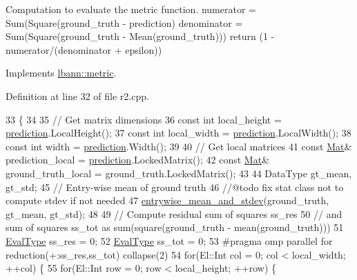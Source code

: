 Computation to evaluate the metric function. numerator = Sum(Square(ground\+\_\+truth -\/ prediction) denominator = Sum(Square(ground\+\_\+truth -\/ Mean(ground\+\_\+truth))) return (1 -\/ numerator/(denominator + epsilon)) 

Implements \hyperlink{classlbann_1_1metric_aab79147ff480675db2e01d7a889a4296}{lbann\+::metric}.



Definition at line 32 of file r2.\+cpp.


\begin{DoxyCode}
33                                                                                      \{
34 
35   \textcolor{comment}{// Get matrix dimensions}
36   \textcolor{keyword}{const} \textcolor{keywordtype}{int} local\_height = \hyperlink{base_8hpp_a2781a159088df64ed7d47cc91c4dc0a8ac41b9ec75e920b610e8907e066074b30}{prediction}.LocalHeight();
37   \textcolor{keyword}{const} \textcolor{keywordtype}{int} local\_width = \hyperlink{base_8hpp_a2781a159088df64ed7d47cc91c4dc0a8ac41b9ec75e920b610e8907e066074b30}{prediction}.LocalWidth();
38   \textcolor{keyword}{const} \textcolor{keywordtype}{int} width = \hyperlink{base_8hpp_a2781a159088df64ed7d47cc91c4dc0a8ac41b9ec75e920b610e8907e066074b30}{prediction}.Width();
39   
40   \textcolor{comment}{// Get local matrices}
41   \textcolor{keyword}{const} \hyperlink{base_8hpp_a68f11fdc31b62516cb310831bbe54d73}{Mat}& prediction\_local = \hyperlink{base_8hpp_a2781a159088df64ed7d47cc91c4dc0a8ac41b9ec75e920b610e8907e066074b30}{prediction}.LockedMatrix();
42   \textcolor{keyword}{const} \hyperlink{base_8hpp_a68f11fdc31b62516cb310831bbe54d73}{Mat}& ground\_truth\_local = ground\_truth.LockedMatrix();
43 
44   DataType gt\_mean, gt\_std;
45   \textcolor{comment}{// Entry-wise mean of ground truth}
46   \textcolor{comment}{//@todo fix stat class not to compute stdev if not needed }
47   \hyperlink{namespacelbann_a604ae9da0173b8be2bfb6877997d6d5c}{entrywise\_mean\_and\_stdev}(ground\_truth, gt\_mean, gt\_std);
48 
49   \textcolor{comment}{// Compute residual sum of squares ss\_res}
50   \textcolor{comment}{// and sum of squares ss\_tot as sum(square(ground\_truth - mean(ground\_truth)))}
51   \hyperlink{base_8hpp_a3266f5ac18504bbadea983c109566867}{EvalType} ss\_res = 0;
52   \hyperlink{base_8hpp_a3266f5ac18504bbadea983c109566867}{EvalType} ss\_tot = 0;
53 \textcolor{preprocessor}{  #pragma omp parallel for reduction(+:ss\_res,ss\_tot) collapse(2)}
54   \textcolor{keywordflow}{for}(El::Int col = 0; col < local\_width; ++col) \{
55     \textcolor{keywordflow}{for}(El::Int row = 0; row < local\_height; ++row) \{

\end{DoxyCode}
